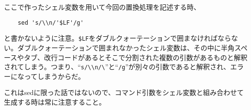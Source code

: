 ここで作ったシェル変数を用いて今回の置換処理を記述する時、
\begin{verbatim}
	sed 's/\\n/'$LF'/g'
\end{verbatim}
と書かないように注意。\verb|$LF|をダブルクォーテーションで囲まなければならない。ダブルクォーテーションで囲まれなかったシェル変数は、その中に半角スペースやタブ、改行コードがあるとそこで分割された複数の引数があるものと解釈されてしまう。つまり、``\verb|s/\\n/\|''と``\verb|/g|''が別々の引数であると解釈され、エラーになってしまうからだ。

これはsedに限った話ではないので、コマンド引数をシェル変数と組み合わせて生成する時は常に注意すること。